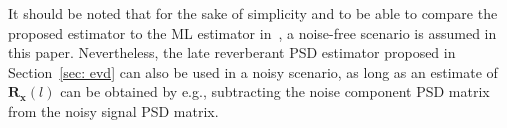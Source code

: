 \documentclass{article}
\begin{document}
It should be noted that for the sake of simplicity and to be able to compare the proposed estimator to the ML estimator in~\cite{Kuklasinski_EUSIPCO_2014g}, a noise-free scenario is assumed in this paper. 
Nevertheless, the late reverberant PSD estimator proposed in Section~\ref{sec: evd} can also be used in a noisy scenario, as long as an estimate of $\mathbf{R}_{\mathbf{x}}(l)$ can be obtained by e.g., subtracting the noise component PSD matrix from the noisy signal PSD matrix.


\end{document}
